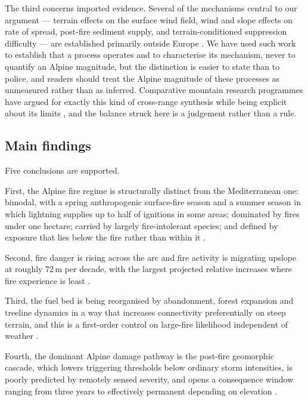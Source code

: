 \documentclass[11pt,a4paper]{article}
\begin{document}
The third concerns imported evidence. Several of the mechanisms central to our argument --- terrain effects on the surface wind field, wind and slope effects on rate of spread, post-fire sediment supply, and terrain-conditioned suppression difficulty --- are established primarily outside Europe \citep{sharples_overview_2009, hayajneh_wind_2026, morell_sediment_2021, cardil_assessing_2025}. We have used such work to establish that a process operates and to characterise its mechanism, never to quantify an Alpine magnitude, but the distinction is easier to state than to police, and readers should treat the Alpine magnitude of these processes as unmeasured rather than as inferred. Comparative mountain research programmes have argued for exactly this kind of cross-range synthesis while being explicit about its limits \citep{payne_nature_2020}, and the balance struck here is a judgement rather than a rule.

\subsection{Main findings}

Five conclusions are supported.

First, the Alpine fire regime is structurally distinct from the Mediterranean one: bimodal, with a spring anthropogenic surface-fire season and a summer season in which lightning supplies up to half of ignitions in some areas; dominated by fires under one hectare; carried by largely fire-intolerant species; and defined by exposure that lies below the fire rather than within it \citep{muller_forest_2020, valese_wildfires_2011, bercak_combination_2024, mutterer_bark_2026}.

Second, fire danger is rising across the arc and fire activity is migrating upslope at roughly 72\,m per decade, with the largest projected relative increases where fire experience is least \citep{beloiu_climatedriven_2026, gerberding_mapping_2025, miller_climate_2024}.

Third, the fuel bed is being reorganised by abandonment, forest expansion and treeline dynamics in a way that increases connectivity preferentially on steep terrain, and this is a first-order control on large-fire likelihood independent of weather \citep{frei_evidence_2023, stritih_alternative_2023, conedera_linking_2024}.

Fourth, the dominant Alpine damage pathway is the post-fire geomorphic cascade, which lowers triggering thresholds below ordinary storm intensities, is poorly predicted by remotely sensed severity, and opens a consequence window ranging from three years to effectively permanent depending on elevation \citep{laporta_postwildfire_2025, negri_wildfire_2026, degiuli_arrested_2024, moos_climate_2021}.
\end{document}
